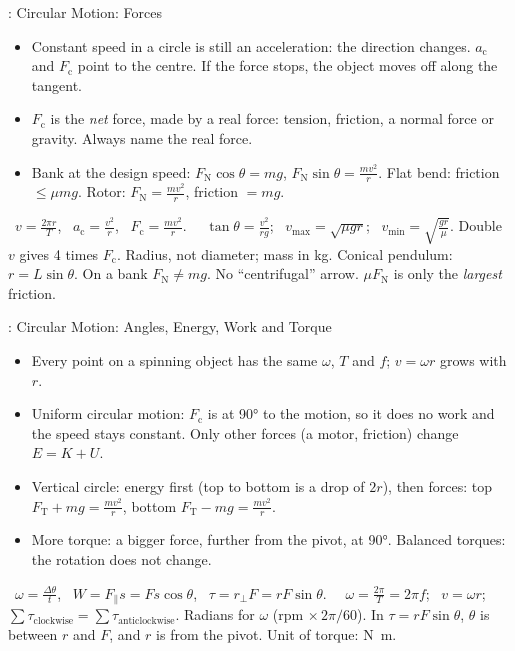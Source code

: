 \begin{summarybox}[fontupper=\small, unbreakable]{: Circular Motion: Forces}
\begin{itemize}[itemsep=0pt, topsep=0pt]
  \item Constant speed in a circle is still an acceleration: the direction changes.
        $a_\mathrm{c}$ and $F_\mathrm{c}$ point to the centre. If the force stops, the object
        moves off along the tangent.
  \item $F_\mathrm{c}$ is the \emph{net} force, made by a real force: tension, friction, a
        normal force or gravity. Always name the real force.
  \item Bank at the design speed: $F_\mathrm{N}\cos\theta = mg$, $F_\mathrm{N}\sin\theta =
        \frac{mv^2}{r}$. Flat bend: friction $\le \mu mg$. Rotor: $F_\mathrm{N} = \frac{mv^2}{r}$,
        friction $= mg$.
\end{itemize}
 \sumSheet\ $v = \frac{2\pi r}{T}$, \ $a_\mathrm{c} = \frac{v^2}{r}$, \
$F_\mathrm{c} = \frac{mv^2}{r}$. \ \sumLearn\ $\tan\theta = \frac{v^2}{rg}$; \
$v_\mathrm{max} = \sqrt{\mu g r}$; \ $v_\mathrm{min} = \sqrt{\frac{gr}{\mu}}$.
\sumhead{Traps} Double $v$ gives 4 times $F_\mathrm{c}$. Radius, not diameter; mass in kg.
Conical pendulum: $r = L\sin\theta$. On a bank $F_\mathrm{N} \ne mg$. No ``centrifugal''
arrow. $\mu F_\mathrm{N}$ is only the \emph{largest} friction.
\end{summarybox}

\begin{summarybox}[fontupper=\small, unbreakable]{: Circular Motion: Angles, Energy, Work and Torque}
\begin{itemize}[itemsep=0pt, topsep=0pt]
  \item Every point on a spinning object has the same $\omega$, $T$ and $f$; $v = \omega r$
        grows with $r$.
  \item Uniform circular motion: $F_\mathrm{c}$ is at \ang{90} to the motion, so it does no
        work and the speed stays constant. Only other forces (a motor, friction) change $E = K + U$.
  \item Vertical circle: energy first (top to bottom is a drop of $2r$), then forces: top
        $F_\mathrm{T} + mg = \frac{mv^2}{r}$, bottom $F_\mathrm{T} - mg = \frac{mv^2}{r}$.
  \item More torque: a bigger force, further from the pivot, at \ang{90}. Balanced torques:
        the rotation does not change.
\end{itemize}
 \sumSheet\ $\omega = \frac{\Delta\theta}{t}$, \ $W = F_\parallel s = Fs\cos\theta$, \
$\tau = r_\perp F = rF\sin\theta$. \ \sumLearn\ $\omega = \frac{2\pi}{T} = 2\pi f$; \
$v = \omega r$; \ $\sum\tau_\mathrm{clockwise} = \sum\tau_\mathrm{anticlockwise}$.
 Radians for $\omega$ (rpm $\times\,2\pi/60$). In $\tau = rF\sin\theta$,
$\theta$ is between $r$ and $F$, and $r$ is from the pivot. Unit of torque: \si{N.m}.
\end{summarybox}

